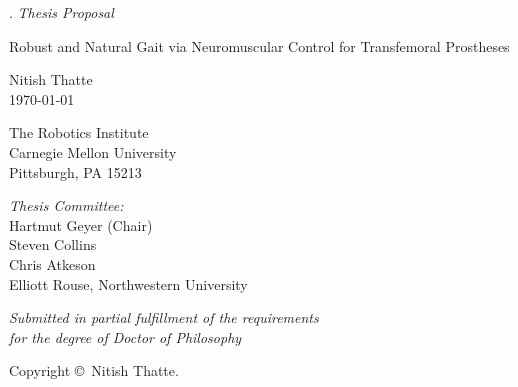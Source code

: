 \documentclass{tufte-book}
\title{\proposaltitle}
\author[Nitish Thatte]{Nitish Thatte}
\newcommand{\proposaltitle}{Robust and Natural Gait via Neuromuscular Control
for Transfemoral Prostheses}
\begin{document}

\begin{titlepage}
	\begin{fullwidth}
	\centering
    \phantom.
    \vspace{0.5in}
    {\Large \it Thesis Proposal} \\
    {\huge{\proposaltitle}\par}
    \vspace{0.5in}
    
    Nitish Thatte \\
    \today \\
    \vspace{0.9 in}
    
    The Robotics Institute \\
    Carnegie Mellon University \\
    Pittsburgh, PA 15213
    \vspace{0.9 in}
    
   	{\it Thesis Committee:}\\
    Hartmut Geyer (Chair)\\
    Steven Collins\\
    Chris Atkeson\\
    Elliott Rouse, Northwestern University\\
    \vspace{0.9 in}
   
   	{\it Submitted in partial fulfillment of the requirements\\ for the degree of Doctor of Philosophy}\\
    \vspace{0.9 in}
    
    Copyright \copyright \the\year \ Nitish Thatte.
 	\end{fullwidth}
\end{titlepage}



\tableofcontents

\listoffigures

\listoftables


\mainmatter








\backmatter



\end{document}
